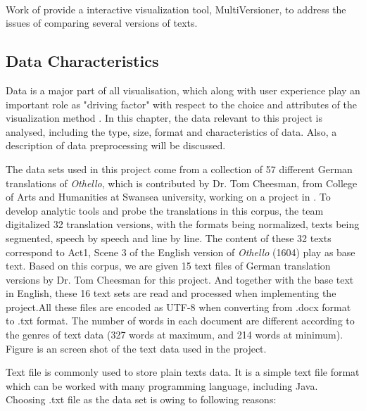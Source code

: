 \paragraph[]{}Work of \cite{Jong2008} provide a interactive visualization tool, MultiVersioner, to address the issues of comparing several versions of texts.


\subsection{Data Characteristics}

Data is a major part of all visualisation, which along with user experience play an important role as "driving factor" with respect to the choice and attributes of the visualization method \cite{Laramee}. In this chapter, the data relevant to this project is analysed, including the type, size, format and characteristics of data. Also, a description of data preprocessing will be discussed. 

The data sets used in this project come from a collection of 57 different German translations of \emph{Othello}, which is contributed by Dr. Tom Cheesman, from College of Arts and Humanities at Swansea university, working on a project in \cite{Tom2012}. To develop analytic tools and probe the translations in this corpus, the team digitalized 32 translation versions, with the formats being normalized, texts being segmented, speech by speech and line by line. The content of these 32 texts correspond to Act1, Scene 3 of the English version of \emph{Othello} (1604) play as base text. Based on this corpus, we are given 15 text files of German translation versions by Dr. Tom Cheesman for this project. And together with the base text in English, these 16 text sets are read and processed when implementing the project.All these files are encoded as UTF-8 when converting from .docx format to .txt format. The number of words in each document are different according to the genres of text data (327 words at maximum, and 214 words at minimum). Figure \label{dataExample} is an screen shot of the text data used in the project.

Text file is commonly used to store plain texts data. It is a simple text file format which can be worked with many programming language, including Java. Choosing .txt file as the data set is owing to following reasons:

